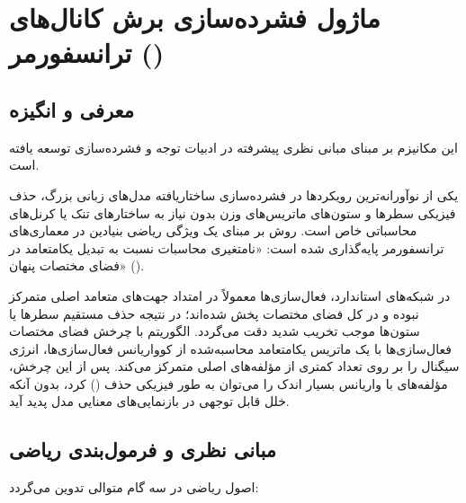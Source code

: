 \section{ماژول فشرده‌سازی برش کانال‌های ترانسفورمر ()}
\label{sec:slicegpt}

\subsection{معرفی و انگیزه}
این مکانیزم بر مبنای مبانی نظری پیشرفته در ادبیات توجه و فشرده‌سازی \cite{ashkboos2024slicegpt} توسعه یافته است.

یکی از نوآورانه‌ترین رویکردها در فشرده‌سازی ساختاریافته مدل‌های زبانی بزرگ، حذف فیزیکی سطرها و ستون‌های ماتریس‌های وزن بدون نیاز به ساختارهای تنک یا کرنل‌های محاسباتی خاص است. روش  بر مبنای یک ویژگی ریاضی بنیادین در معماری‌های ترانسفورمر پایه‌گذاری شده است: «نامتغیری محاسبات نسبت به تبدیل یکامتعامد در فضای مختصات پنهان» ().

در شبکه‌های استاندارد، فعال‌سازی‌ها معمولاً در امتداد جهت‌های متعامد اصلی متمرکز نبوده و در کل فضای مختصات پخش شده‌اند؛ در نتیجه حذف مستقیم سطرها یا ستون‌ها موجب تخریب شدید دقت می‌گردد. الگوریتم  با چرخش فضای مختصات فعال‌سازی‌ها با یک ماتریس یکامتعامد محاسبه‌شده از کوواریانس فعال‌سازی‌ها، انرژی سیگنال را بر روی تعداد کمتری از مؤلفه‌های اصلی متمرکز می‌کند. پس از این چرخش، مؤلفه‌های با واریانس بسیار اندک را می‌توان به طور فیزیکی حذف () کرد، بدون آنکه خلل قابل توجهی در بازنمایی‌های معنایی مدل پدید آید.

\subsection{مبانی نظری و فرمول‌بندی ریاضی}
اصول ریاضی  در سه گام متوالی تدوین می‌گردد:

